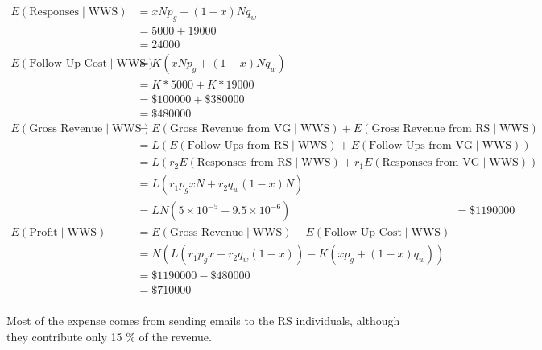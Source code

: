 \documentclass{article}
\begin{document}
\begin{align}
E\left( \text{Responses} \mid \text{WWS} \right) 
	& = x N p_g + (1 - x) N q_w \nonumber \\
	& = 5000 + 19000 \nonumber \\
	& = 24000 \nonumber \\
E\left( \text{Follow-Up Cost} \mid \text{WWS} \right)
	& = K \left( x N p_g + (1 - x) N q_w \right) \nonumber \\
	& = K * 5000 + K * 19000 \nonumber \\
	& = \$ 100000 + \$ 380000\nonumber\\
	& = \$ 480000 \nonumber \\
E\left( \text{Gross Revenue} \mid \text{WWS} \right)
	& = E\left( \text{Gross Revenue from VG} \mid \text{WWS} \right)
	+ E\left( \text{Gross Revenue from RS} \mid \text{WWS} \right) \nonumber \\
	& = L \left( 
		E\left( \text{Follow-Ups from RS} \mid \text{WWS} \right)
		+ E\left( \text{Follow-Ups from VG} \mid \text{WWS} \right) \right) \nonumber \\
	& = L \left( 
		r_2 E\left( \text{Responses from RS} \mid \text{WWS} \right)
		+ r_1 E\left( \text{Responses from VG} \mid \text{WWS} \right) \right) \nonumber \\
	& = L \left( 
		r_1 p_g x N
		+ r_2 q_w (1-x) N  \right) \nonumber \\
	& = L N \left( 5 \times 10^{-5} + 9.5 \times 10^{-6} \right)
	& = \$ 1190000 \nonumber \\
E\left( \text{Profit} \mid \text{WWS} \right)
	& = E\left( \text{Gross Revenue} \mid \text{WWS} \right)
	- E\left( \text{Follow-Up Cost} \mid \text{WWS} \right) \nonumber \\
	& = N \left( L \left( 
		r_1 p_g x
		+ r_2 q_w (1-x)  \right) 
	- K \left(x p_g + (1 - x) q_w \right) \right) \nonumber\\
	& = \$ 1190000 - \$ 480000 \nonumber \\
	& = \$ 710000 \nonumber \\
\end{align}

Most of the expense comes from sending emails to the RS individuals,
	although they contribute only 15 \% of the revenue.
\end{document}
